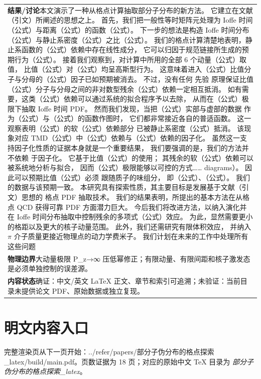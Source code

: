 \documentclass[UTF8,11pt,oneside]{ctexbook}
\begin{document}
\begin{table}[htbp]
\begin{tabular}{@{}p{}@{}}
    \textbf{结果/讨论}\quad 本文演示了一种从格点计算抽取部分子分布的新方法。 它建立在文献（引文）所阐述的思想之上。 首先，我们把一般性等时矩阵元处理为 Ioffe 时间（公式）与距离（公式）的函数（公式）。 下一步的想法是构造 Ioffe 时间分布（公式）与静止系密度（公式）之比（公式）。 我们的格点计算清楚地表明，静止系函数的（公式）依赖中存在线性成分， 它可以归因于规范链接所生成的预期行为（公式）。 接着我们观察到，对计算中所用的全部 6 个动量（公式）取值， 比值（公式）对（公式）均呈高斯型行为。 这意味着进入（公式）比值分子与分母的（公式）因子已如预期被消去。 不过，没有任何 先验 原理保证比值（公式）分子与分母之间的非对数型残余（公式）依赖一定相互抵消。 如有需要，这类（公式）依赖可以通过系统的拟合程序予以去除， 从而在（公式）极限下抽取 Ioffe 时间 PDF。 然而我们发现，当把（公式）实部与虚部的数据 作为（公式）与（公式）的函数作图时， 它们都非常接近各自的普适函数。 这一观察表明（公式）的软（公式）依赖部分 已被静止系密度（公式）抵消。 该现象对应 TMD（公式）中（公式）依赖与（公式）依赖的因子化。 虽然这一支持因子化性质的证据本身就是一个重要结果， 我们要强调的是，我们的方法并 不依赖 于因子化。 它基于比值（公式）的使用； 其残余的软（公式）依赖可以被系统地分析与拟合， 因而（公式）极限能够以可控的方式…… diagrams）。 因此可以预期比值（公式）必须 跟随质子的味组分， 即（公式）、（公式）。 我们的数据与该预期一致。 本研究具有探索性质，其主要目标是发展基于文献（引文）思想的 格点 PDF 抽取技术。 我们的结果表明，所提出的基本方法在从格点 QCD 获得可靠 PDF 方面潜力巨大。 今后我们将改进方法，以纳入演化并在 Ioffe 时间分布抽取中控制残余的多项式（公式）效应。 为此，显然需要更小的格距以及更大的核子动量范围。 此外，我们还需研究有限体积效应， 并纳入 $\pi$ 介子质量更接近物理点的动力学费米子。 我们计划在未来的工作中处理所有这些问题 \\
    \textbf{物理边界}\quad 大动量极限 P\_z→∞ 压低幂修正；有限动量、有限间距和核子激发态是必须单独控制的误差源。 \\
    \textbf{内容状态}\quad 确证：中文/英文 LaTeX 正文、章节和索引可追溯；未验证：当前目录未提供论文 PDF、原始数据或独立复现。 \\
    \bottomrule
  \end{tabular}
\end{table}
\section*{明文内容入口}
\noindent 完整渲染页从下一页开始：../\allowbreak{}refer/\allowbreak{}papers/\allowbreak{}部分子伪分布的格点探索\_\allowbreak{}latex/\allowbreak{}build/\allowbreak{}main.pdf。页数证据为 18 页；对应的原始中文 TeX 目录为 \emph{部分子伪分布的格点探索\_latex}。
\clearpage

\clearpage
\end{document}
